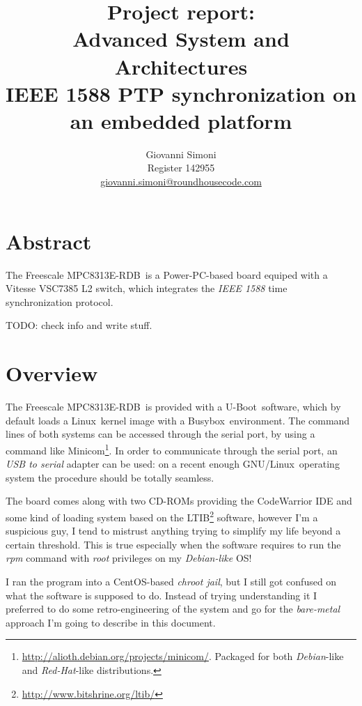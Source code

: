 \documentclass[10pt,a4paper]{article}
\title {
    Project report:\\
    Advanced System and Architectures\\
    IEEE 1588 PTP synchronization on an embedded platform
}
\author{
    Giovanni Simoni\\
    Register 142955\\
    \href{mailto:giovanni.simoni@roundhousecode.com}
         {giovanni.simoni@roundhousecode.com}
}
\newcommand{\TechName}[1]{\textsf{{#1}}}
\newcommand{\StdName}[1]{\emph{{#1}}}
\newcommand{\MyBoard}{\TechName{Freescale MPC8313E-RDB}}
\newcommand{\PPC}{\TechName{Power-PC}}
\newcommand{\uBoot}{\TechName{U-Boot}}
\newcommand{\Linux}{\TechName{Linux}}
\newcommand{\GNULinux}{\TechName{GNU}/\Linux}
\newcommand{\BusyBox}{\TechName{Busybox}}
\newcommand{\Minicom}{\TechName{Minicom}}
\newcommand{\LTIB}{\TechName{LTIB}}
\begin{document}
\maketitle

    \section*{ \center Abstract }

        The \MyBoard\ is a \PPC-based board equiped with a
        \TechName{Vitesse VSC7385 L2 switch}, which integrates the
        \StdName{IEEE 1588} time synchronization protocol.

        TODO: check info and write stuff.

    \tableofcontents
    \newpage

    \section{ Overview }
    \label{sec:Overview}

        The \MyBoard\ is
        provided with a \uBoot\ software, which by default loads a \Linux\
        kernel image with a \BusyBox\ environment. The command lines of
        both systems can be accessed through the serial port, by using a
        command like \Minicom\footnote{
            \url{http://alioth.debian.org/projects/minicom/}. Packaged for
        both \emph{Debian}-like and \emph{Red-Hat}-like distributions.
        }. In order to communicate through the serial port, an \emph{USB
        to serial} adapter can be used: on a recent enough \GNULinux\
        operating system the procedure should be totally seamless.

        The board comes along with two CD-ROMs providing the
        \TechName{CodeWarrior} IDE and some kind of loading system based
        on the \LTIB\footnote{ \url{http://www.bitshrine.org/ltib/} }
        software, however I'm a suspicious guy, I tend to mistrust
        anything trying to simplify my life beyond a certain threshold.
        This is true especially when the software requires to run the
        \emph{rpm} command with \emph{root} privileges on my
        \emph{Debian-like} OS!

        I ran the program into a \TechName{CentOS}-based \emph{chroot
        jail}, but I still got confused on what the software is supposed
        to do. Instead of trying understanding it I preferred to do
        some retro-engineering of the system and go for the
        \emph{bare-metal} approach I'm going to describe in this
        document.
\end{document}
